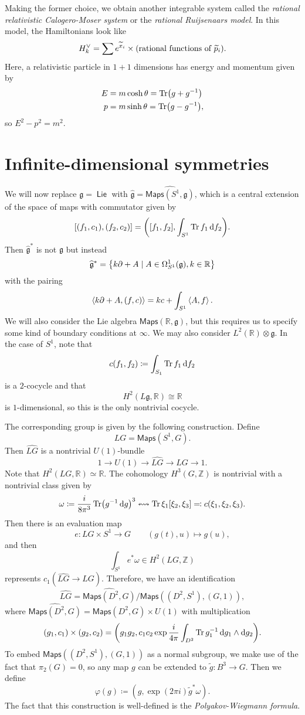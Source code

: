 \documentclass[leqno, openany]{memoir}
\theoremstyle{definition}
\theoremstyle{remark}
\theoremstyle{plain}
\theoremstyle{definition}
\theoremstyle{remark}
\newcommand{\R}{\mathbb{R}}
\newcommand{\Z}{\mathbb{Z}}
\newcommand{\g}{\mathfrak{g}}
\newcommand{\ms}[1]{\mathsf{#1}}
\newcommand{\on}[1]{\operatorname{#1}}
\newcommand{\wt}[1]{\widetilde{#1}}
\newcommand{\wh}[1]{\widehat{#1}}
\begin{document}
Making the former choice, we obtain another integrable system called the \textit{rational relativistic Calogero-Moser system} or the \textit{rational Ruijsenaars model}. In this model, the Hamiltonians look like
\[ H_k^{\vee} = \sum e^{\wt{x}_i} \times \qty(\text{rational functions of }\wt{p}_i). \]
Here, a relativistic particle in $1+1$ dimensions has energy and momentum given by
\begin{align*}
  E &= m\cosh \theta = \Tr(g+g^{-1}) \\
  p &= m \sinh \theta = \Tr(g-g^{-1}),
\end{align*}
so $E^2-p^2 = m^2$.

\section{Infinite-dimensional symmetries}
\label{sec:infinite}

We will now replace $\g = \on{\ms{Lie}}$ with $\wh{\g} = \wh{\ms{Maps}(S^1, \g)}$, which is a central extension of the space of maps with commutator given by
\[ [(f_1, c_1), (f_2, c_2)] = \qty([f_1, f_2], \int_{S^1} \Tr f_1 \dd{f_2}). \]
Then $\wh{\g}^*$ is not $\g$ but instead
\[ \wh{\g}^* = \qty{k \partial + A \mid A \in \Omega^1_{S^1}(\g), k \in \R} \]
with the pairing
\[ \ev{k \partial + A, (f,c)} = kc + \int_{S^1} \ev{A,f}. \]
We will also consider the Lie algebra $\ms{Maps}(\R, \g)$, but this requires us to specify some kind of boundary conditions at $\infty$. We may also consider $L^2(\R) \otimes \g$. In the case of $S^1$, note that
\[ c(f_1, f_2) \coloneqq \int_{S_1} \Tr f_1 \dd{f_2} \]
is a $2$-cocycle and that
\[ H^2(L\g, \R) \cong \R \]
is $1$-dimensional, so this is the only nontrivial cocycle.

The corresponding group is given by the following construction. Define
\[ LG = \ms{Maps}(S^1, G). \]
Then $\wh{LG}$ is a nontrivial $U(1)$-bundle
\[ 1 \to U(1) \to \wh{LG} \to LG \to 1. \]
Note that $H^2(LG, \R) \simeq \R$. The cohomology $H^3(G,\Z)$ is nontrivial with a nontrivial class given by
\[ \omega \coloneqq \frac{i}{8\pi^3} \Tr(g^{-1}\dd{g})^3 \leftrightsquigarrow \Tr \xi_1[\xi_2, \xi_3] \eqqcolon c(\xi_1, \xi_2, \xi_3). \]
Then there is an evaluation map
\[ e \colon LG \times S^1 \to G \qquad (g(t), u) \mapsto g(u), \]
and then
\[ \int_{S^1} e^* \omega \in H^2(LG, \Z) \]
represents $c_1(\wh{LG} \to LG)$. Therefore, we have an identification
\[ \wh{LG} = \wh{\ms{Maps}(D^2, G)} / \ms{Maps}((D^2, S^1), (G, 1)), \]
where $\wh{\ms{Maps}(D^2, G)} = \ms{Maps}(D^2, G) \times U(1)$ with multiplication
\[ (g_1, c_1) \times (g_2, c_2) = \qty(g_1g_2, c_1c_2 \exp \frac{i}{4\pi}\int_{D^2} \Tr g_1^{-1} \dd{g_1} \wedge \dd{g_2}). \]
To embed $\ms{Maps}((D^2, S^1), (G,1))$ as a normal subgroup, we make use of the fact that $\pi_2(G) = 0$, so any map $g$ can be extended to $\wt{g} \colon B^3 \to G$. Then we define
\[ \varphi(g) \coloneqq (g, \exp(2\pi i) \wt{g}^* \omega). \]
The fact that this construction is well-defined is the \textit{Polyakov-Wiegmann formula}.
\end{document}
